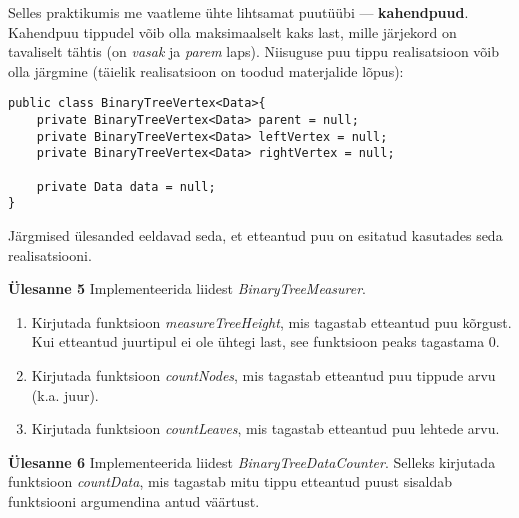 \documentclass[a4paper]{article}
\begin{document}
Selles praktikumis me vaatleme ühte lihtsamat puutüübi --- \textbf{kahendpuud}. Kahendpuu tippudel võib olla maksimaalselt kaks last, mille järjekord on tavaliselt tähtis (on \emph{vasak} ja \emph{parem} laps). Niisuguse puu tippu realisatsioon võib olla järgmine (täielik realisatsioon on toodud materjalide lõpus):

\begin{lstlisting}
public class BinaryTreeVertex<Data>{
	private BinaryTreeVertex<Data> parent = null;
	private BinaryTreeVertex<Data> leftVertex = null;
	private BinaryTreeVertex<Data> rightVertex = null;
	
	private Data data = null;
}
\end{lstlisting}

Järgmised ülesanded eeldavad seda, et etteantud puu on esitatud kasutades seda realisatsiooni.

\begin{problem}
\textbf{Ülesanne 5}
\newline
Implementeerida liidest \textit{BinaryTreeMeasurer}.
\begin{enumerate}
\item
Kirjutada funktsioon \textit{measureTreeHeight}, mis tagastab etteantud puu kõrgust.
Kui etteantud juurtipul ei ole ühtegi last, see funktsioon peaks tagastama 0.
\item
Kirjutada funktsioon \textit{countNodes}, mis tagastab etteantud puu tippude arvu (k.a. juur).
\item
Kirjutada funktsioon \textit{countLeaves}, mis tagastab etteantud puu lehtede arvu.
\end{enumerate}
\end{problem}

\begin{problem}
\textbf{Ülesanne 6}
\newline
Implementeerida liidest \textit{BinaryTreeDataCounter}. Selleks kirjutada funktsioon \textit{countData}, mis tagastab mitu tippu etteantud puust sisaldab funktsiooni argumendina antud väärtust.
\end{problem}
\end{document}
